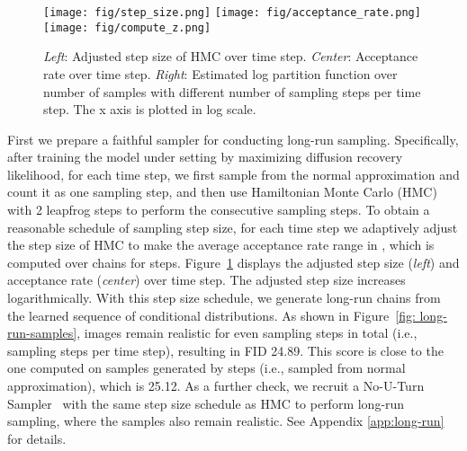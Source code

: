 \documentclass{article} \usepackage{iclr2021_conference,times}
\def\Figref#1{Figure~\ref{#1}}
\begin{document}
\begin{figure}[ht]
\begin{center}
\texttt{[image: fig/step\_size.png]}
\texttt{[image: fig/acceptance\_rate.png]}
\texttt{[image: fig/compute\_z.png]}
\end{center}
\caption{{\em Left}: Adjusted step size of HMC over time step. {\em Center}: Acceptance rate over time step. {\em Right}: Estimated log partition function over number of samples with different number of sampling steps per time step. The x axis is plotted in log scale.}
\vspace{-0.3cm}
\label{fig: long-run}
\end{figure}
First we prepare a faithful sampler for conducting long-run sampling. Specifically, after training the model under  setting by maximizing diffusion recovery likelihood, for each time step, we first sample from the normal approximation and count it as one sampling step, and then use Hamiltonian Monte Carlo (HMC)~\citep{neal2011mcmc} with 2 leapfrog steps to perform the consecutive sampling steps. To obtain a reasonable schedule of sampling step size, for each time step we adaptively adjust the step size of HMC to make the average acceptance rate range in , which is computed over  chains for  steps. \Figref{fig: long-run} displays the adjusted step size ({\em left}) and acceptance rate ({\em center}) over time step. The adjusted step size increases logarithmically. With this step size schedule, we generate long-run chains from the learned sequence of conditional distributions. As shown in \Figref{fig: long-run-samples}, images remain realistic for even  sampling steps in total (i.e.,  sampling steps per time step), resulting in FID 24.89. This score is close to the one computed on samples generated by  steps (i.e., sampled from normal approximation), which is 25.12. As a further check, we recruit a No-U-Turn Sampler~\citep{hoffman2014no} with the same step size schedule as HMC to perform long-run sampling, where the samples also remain realistic. See Appendix \ref{app:long-run} for details.
\end{document}
